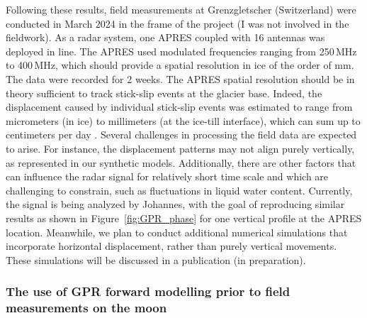 Following these results, field measurements at Grenzgletscher (Switzerland) were conducted in March 2024 in the frame of the project (I was not involved in the fieldwork). As a radar system, one APRES coupled with 16 antennas was deployed in line. The APRES used modulated frequencies ranging from 250\,MHz to 400\,MHz, which should provide a spatial resolution in ice of the order of mm. The data were recorded for 2 weeks. The APRES spatial resolution should be in theory sufficient to track stick-slip events at the glacier base. Indeed, the displacement caused by individual stick-slip events was estimated to range from micrometers (in ice) to millimeters (at the ice-till interface), which can sum up to centimeters per day \citep{Grab&al2021}. Several challenges in processing the field data are expected to arise. For instance, the displacement patterns may not align purely vertically, as represented in our synthetic models. Additionally, there are other factors that can influence the radar signal for relatively short time scale and which are challenging to constrain, such as fluctuations in liquid water content. Currently, the signal is being analyzed by Johannes, with the goal of reproducing similar results as shown in Figure~\ref{fig:GPR_phase} for one vertical profile at the APRES location. Meanwhile, we plan to conduct additional numerical simulations that incorporate horizontal displacement, rather than purely vertical movements. These simulations will be discussed in a publication (in preparation).

\subsubsection{The use of GPR forward modelling prior to field measurements on the moon}

